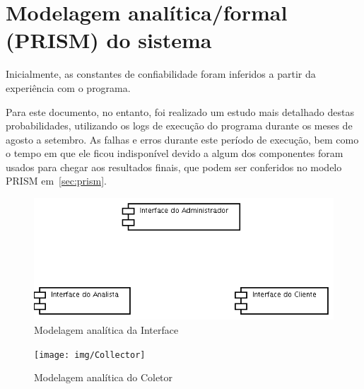 \section{Modelagem analítica/formal (PRISM) do sistema}

Inicialmente, as constantes de confiabilidade foram inferidos a partir
da experiência com o programa.

Para este documento, no entanto, foi realizado um estudo mais
detalhado destas probabilidades, utilizando os logs de execução do
programa durante os meses de agosto a setembro. As falhas e erros
durante este período de execução, bem como o tempo em que ele
ficou indisponível devido a algum dos componentes foram usados para
chegar aos resultados finais, que podem ser conferidos no modelo
PRISM em~\ref{sec:prism}.

\begin{figure}[htbp]
\centering
\includegraphics[width=1.0\textwidth]{img/Interface}
\caption{Modelagem analítica da Interface}
\label{fig:anali-inter}
\end{figure}

\begin{figure}[htbp]
\centering
\texttt{[image: img/Collector]}
\caption{Modelagem analítica do Coletor}
\label{fig:anali-coletor}
\end{figure}

